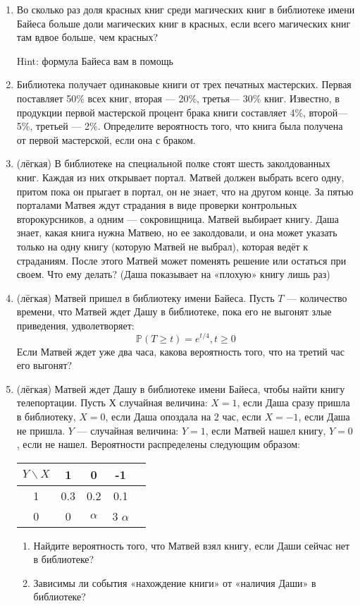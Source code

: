 \documentclass[a4paper,12pt]{article}
\def \P{\mathbb{P}}
\begin{document}
\begin{enumerate} %
\item
Во сколько раз доля красных книг среди магических книг в библиотеке имени Байеса
больше доли магических книг в красных, если всего магических книг
там вдвое больше, чем красных?

Hint: формула Байеса вам в помощь
\item
Библиотека получает одинаковые книги от трех печатных мастерских. Первая поставляет 50\% всех книг, вторая — 20\%, третья— 30\% книг.
Известно, в продукции первой мастерской процент брака книги составляет 4\%, второй— 5\%, третьей — 2\%. Определите вероятность того, что книга была получена от первой мастерской, если она с браком.
\item (лёгкая)
В библиотеке на специальной полке стоят шесть заколдованных книг. Каждая из них открывает портал. Матвей должен выбрать всего одну, притом пока он прыгает в портал, он не знает, что на другом конце. За пятью порталами Матвея ждут страдания в виде проверки контрольных второкурсников, а одним — сокровищница. Матвей выбирает книгу. Даша знает, какая книга нужна Матвею, но ее заколдовали, и она может указать только на одну книгу  (которую Матвей не выбрал), которая ведёт к страданиям. После этого Матвей может поменять решение или остаться при своем. Что ему делать? (Даша показывает на «плохую» книгу лишь раз)
\item (лёгкая)
Матвей пришел в библиотеку имени Байеса. Пусть $T$ — количество времени, что Матвей ждет Дашу в библиотеке, пока его не выгонят злые приведения, удволетворяет:
\[
\P(T \ge t) = e^{t/4}, t\ge 0
\]
Если Матвей ждет уже два часа, какова вероятность того, что на третий час его выгонят?
\item (лёгкая)
Матвей ждет Дашу в библиотеке имени Байеса, чтобы найти книгу телепортации. 
Пусть $Х$ случайная величина: $X = 1$, если Даша сразу пришла в библиотеку, $X = 0$, 
если Даша опоздала на 2 час, если $X=-1$, если Даша не пришла. $Y$ — случайная величина: $Y=1$, если Матвей нашел книгу, $Y=0$, если не нашел. Вероятности распределены следующим образом:
\begin{center}
	\begin{tabular}{ccccc}
		\toprule
		$Y\backslash X$ & 1 & 0 & -1\\
		\midrule
		1 & 0.3 & 0.2& 0.1\\
		0 & 0  & $\alpha$ & 3 $\alpha$ \\
		\bottomrule
	\end{tabular}
\end{center}

\begin{enumerate}
    \item Найдите вероятность того, что Матвей взял книгу, если Даши сейчас нет в библиотеке?
    \item Зависимы ли события «нахождение книги» от «наличия Даши» в библиотеке?
\end{enumerate}

\end{enumerate}
\end{document}

